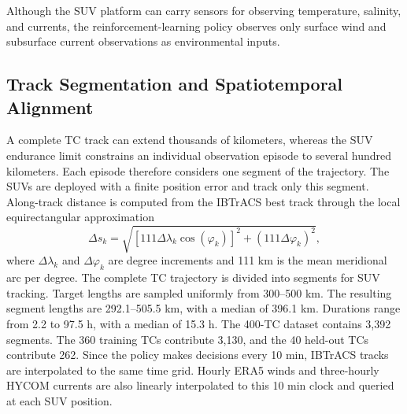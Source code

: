 \documentclass[a4paper,fleqn]{cas-dc}
\begin{document}
\begin{table}[htbp]
\centering
\caption{Environmental Datasets underlying the 400-TC observation
environments. The Datasets include ERA5 surface winds, HYCOM currents at
seven depths, and IBTrACS best tracks.}
\label{tab:data}
\par\smallskip
\parbox{\textwidth}{\small
Although the SUV platform can carry sensors for observing temperature,
salinity, and currents, the reinforcement-learning policy observes only surface
wind and subsurface current observations as environmental inputs.}
\end{table}

\subsection{Track Segmentation and Spatiotemporal Alignment}

A complete TC track can extend thousands of kilometers, whereas the SUV
endurance limit constrains an individual observation episode to several hundred
kilometers. Each episode therefore considers one segment of the trajectory. The
SUVs are deployed with a finite position error and track only this segment.
Along-track distance is computed from the IBTrACS best track through the local
equirectangular approximation
\begin{equation}
\Delta s_k =
\sqrt{
\left[
111\Delta\lambda_k\cos(\varphi_k)
\right]^2
+
\left(111\Delta\varphi_k\right)^2
},
\label{eq:segment_distance}
\end{equation}
where $\Delta\lambda_k$ and $\Delta\varphi_k$ are degree increments and 111 km
is the mean meridional arc per degree. The complete TC trajectory is divided
into segments for SUV tracking. Target lengths are sampled uniformly from
300--500 km. The resulting segment lengths are 292.1--505.5 km, with a median of
396.1 km. Durations range from 2.2 to 97.5 h, with a median of 15.3 h. The
400-TC dataset contains 3,392 segments. The 360 training TCs contribute 3,130,
and the 40 held-out TCs contribute 262. Since the policy makes decisions every 10 min, IBTrACS tracks
are interpolated to the same time grid. Hourly ERA5 winds and three-hourly
HYCOM currents are also linearly interpolated to this 10 min clock and queried
at each SUV position.
\end{document}
